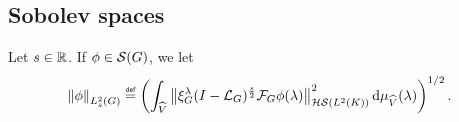 %
%
%

\subsection{Sobolev spaces}

\begin{definition}
    Let $s \in \mathbb{R}$.
    If $\phi \in {\mathcal{S} (G)}$, we let
    \begin{align*}
        \norm[\Sobolev{s}]{\phi} \defeq
        \left(
            \int_\dualGroup\VectorSpace
                \norm[\HilbertSchmidt{\Lebesgue{2}{\CompactGroup}}]{%
                    \Rep\lambda \BesselPotential{s}
                    \Fourier \phi(\lambda)
                    }^2
            \dd \Plancherel\VectorSpace(\lambda)
        \right)^{1 / 2}.
    \end{align*}
\end{definition}

